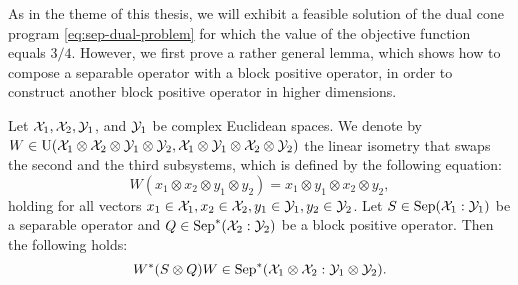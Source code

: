 As in the theme of this thesis, we will exhibit a feasible solution of 
the dual cone program \eqref{eq:sep-dual-problem} for which the value of 
the objective function equals $3/4$.
However, we first prove a rather general lemma, which shows how to compose a separable 
operator with a block positive operator, in order to construct another block positive 
operator in higher dimensions.
\begin{lemma}
\label{lemma:higher-dimension}
Let $\mathcal{X}_{1}, \mathcal{X}_{2}, \mathcal{Y}_{1}$, and $\mathcal{Y}_{1}$ be complex Euclidean spaces. We denote by 
$W \in \mathrm{U}(\mathcal{X}_{1}\otimes\mathcal{X}_{2}\otimes\mathcal{Y}_{1}\otimes\mathcal{Y}_{2},
  \mathcal{X}_{1}\otimes\mathcal{Y}_{1}\otimes\mathcal{X}_{2}\otimes\mathcal{Y}_{2})$ 
the linear isometry that swaps the second and the third subsystems, which is defined by the following equation:
  \begin{equation}
  \label{eq:swap-2}
    W(x_{1}\otimes x_{2}\otimes y_{1}\otimes y_{2}) =
      x_{1}\otimes y_{1}\otimes x_{2}\otimes y_{2},
  \end{equation}
holding for all vectors $x_{1} \in \mathcal{X}_{1}, x_{2} \in \mathcal{X}_{2}, 
y_{1} \in \mathcal{Y}_{1}, y_{2} \in \mathcal{Y}_{2}$.
Let $S \in \mathrm{Sep}(\mathcal{X}_{1}:\mathcal{Y}_{1})$ be a separable operator 
and $Q \in \mathrm{Sep}^{\ast}(\mathcal{X}_{2}:\mathcal{Y}_{2})$ be
a block positive operator. Then the following holds:
  \begin{equation}
  W^{\ast}(S \otimes Q)W\in \mathrm{Sep}^{\ast}(\mathcal{X}_{1}\otimes\mathcal{X}_{2}:\mathcal{Y}_{1}\otimes\mathcal{Y}_{2}).
  \end{equation}
\end{lemma}
